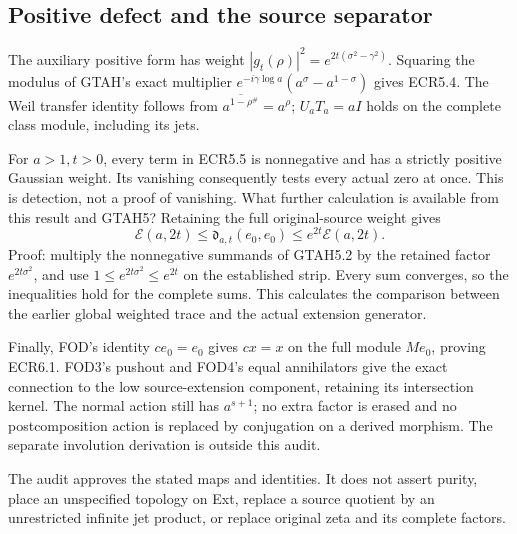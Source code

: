 \subsection{Positive defect and the source
separator}\label{positive-defect-and-the-source-separator}

The auxiliary positive form has weight
\(|g_t(\rho)|^2=e^{2t(\sigma^2-\gamma^2)}\). Squaring the modulus of
GTAH's exact multiplier \(e^{-i\gamma\log a}(a^\sigma-a^{1-\sigma})\)
gives ECR5.4. The Weil transfer identity follows from
\(\overline{a^{1-\rho^\#}}=a^\rho\); \(U_aT_a=aI\) holds on the complete
class module, including its jets.

For \(a>1,t>0\), every term in ECR5.5 is nonnegative and has a strictly
positive Gaussian weight. Its vanishing consequently tests every actual
zero at once. This is detection, not a proof of vanishing. What further
calculation is available from this result and GTAH5? Retaining the full
original-source weight gives \[
\mathcal E(a,2t)
\le\mathfrak d_{a,t}(e_0,e_0)
\le e^{2t}\mathcal E(a,2t).
\tag{ECRA6}
\] Proof: multiply the nonnegative summands of GTAH5.2 by the retained
factor \(e^{2t\sigma^2}\), and use \(1\le e^{2t\sigma^2}\le e^{2t}\) on
the established strip. Every sum converges, so the inequalities hold for
the complete sums. This calculates the comparison between the earlier
global weighted trace and the actual extension generator.

Finally, FOD's identity \(ce_0=e_0\) gives \(cx=x\) on the full module
\(M e_0\), proving ECR6.1. FOD3's pushout and FOD4's equal annihilators
give the exact connection to the low source-extension component,
retaining its intersection kernel. The normal action still has
\(a^{s+1}\); no extra factor is erased and no postcomposition action is
replaced by conjugation on a derived morphism. The separate involution
derivation is outside this audit.

The audit approves the stated maps and identities. It does not assert
purity, place an unspecified topology on Ext, replace a source quotient
by an unrestricted infinite jet product, or replace original zeta and
its complete factors.
